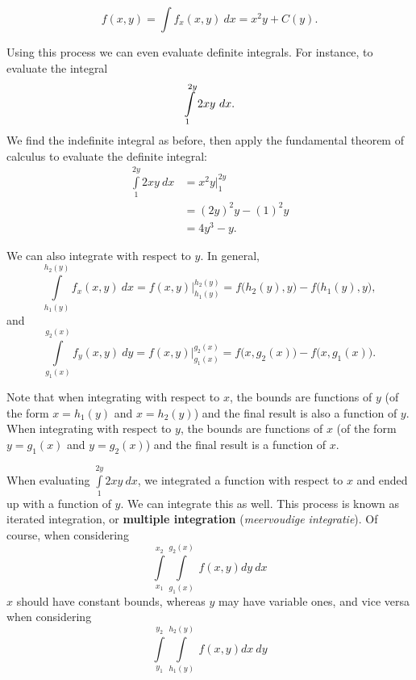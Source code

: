 $$f(x,y) = \int\limits f_x(x,y)\ dx  = x^2y+C(y).$$

Using this process we can even evaluate definite integrals. For instance, to evaluate the integral 
$$\displaystyle \int\limits_1^{2y} 2xy\ dx.$$
We find the indefinite integral as before, then apply the fundamental theorem of calculus to evaluate the definite integral:
\begin{align*}
\int\limits_1^{2y} 2xy\ dx &= x^2y\Big|_1^{2y}\\
			&= (2y)^2y - (1)^2y \\
			&= 4y^3-y.
\end{align*}

We can also integrate with respect to $y$. In general,
$$\int\limits_{h_1(y)}^{h_2(y)} f_x(x,y)\ dx = f(x,y)\Big|_{h_1(y)}^{h_2(y)} = f\big(h_2(y),y\big)-f\big(h_1(y),y\big),$$
and
$$\int\limits_{g_1(x)}^{g_2(x)} f_y(x,y)\ dy = f(x,y)\Big|_{g_1(x)}^{g_2(x)} = f\big(x,g_2(x)\big)-f\big(x,g_1(x)\big).$$

Note that when integrating with respect to $x$, the bounds are functions of $y$ (of the form $x=h_1(y)$ and $x=h_2(y)$) and the final result is also a function of $y$. When integrating with respect to $y$, the bounds are functions of $x$ (of the form $y=g_1(x)$ and $y=g_2(x)$) and the final result is a function of $x$. 

When evaluating $\int\limits_1^{2y} 2xy\ dx$,  we integrated a function with respect to $x$ and ended up with a function of $y$. We can integrate this as well. This process is known as iterated integration, or \textbf{multiple integration} (\textit{meervoudige integratie}). Of course,  when considering 
 $$\int\limits_{x_1}^{x_2}\int\limits_{g_1(x)}^{g_2(x)} \ f(x,y) dy\ dx$$
 $x$ should have constant bounds, whereas $y$ may have variable ones, and vice versa when considering
 $$\int\limits_{y_1}^{y_2}\int\limits_{h_1(y)}^{h_2(y)} \ f(x,y) dx\ dy$$

